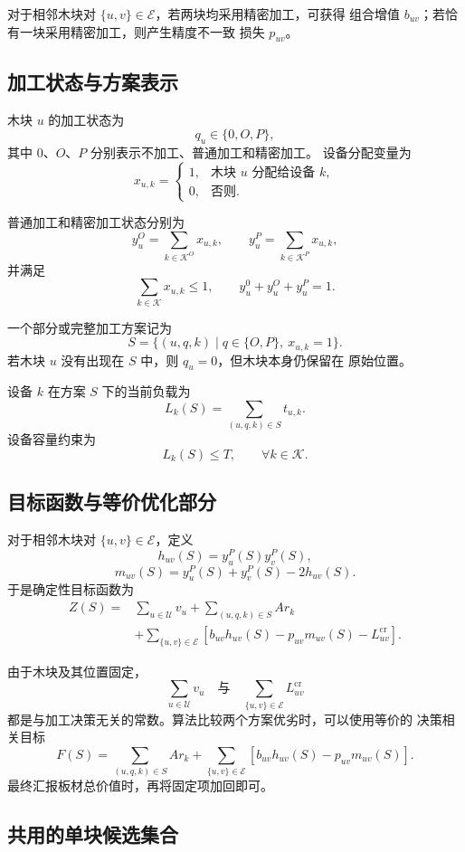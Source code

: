 \documentclass[UTF8,12pt,a4paper]{ctexart}
\newcommand{\U}{\mathcal{U}}
\newcommand{\K}{\mathcal{K}}
\newcommand{\KO}{\mathcal{K}^{O}}
\newcommand{\KP}{\mathcal{K}^{P}}
\newcommand{\E}{\mathcal{E}}
\newcommand{\load}{L}
\begin{document}
对于相邻木块对 \(\{u,v\}\in\E\)，若两块均采用精密加工，可获得
组合增值 \(b_{uv}\)；若恰有一块采用精密加工，则产生精度不一致
损失 \(p_{uv}\)。

\subsection{加工状态与方案表示}

木块 \(u\) 的加工状态为
\[
q_u\in\{0,O,P\},
\]
其中 \(0\)、\(O\)、\(P\) 分别表示不加工、普通加工和精密加工。
设备分配变量为
\[
x_{u,k}=
\begin{cases}
1, & \text{木块 \(u\) 分配给设备 \(k\)},\\
0, & \text{否则}.
\end{cases}
\]

普通加工和精密加工状态分别为
\[
y_u^{O}=\sum_{k\in\KO}x_{u,k},
\qquad
y_u^{P}=\sum_{k\in\KP}x_{u,k},
\]
并满足
\[
\sum_{k\in\K}x_{u,k}\leq 1,
\qquad
y_u^{0}+y_u^{O}+y_u^{P}=1.
\]

一个部分或完整加工方案记为
\[
S=\{(u,q,k)\mid q\in\{O,P\},\ x_{u,k}=1\}.
\]
若木块 \(u\) 没有出现在 \(S\) 中，则 \(q_u=0\)，但木块本身仍保留在
原始位置。

设备 \(k\) 在方案 \(S\) 下的当前负载为
\[
\boxed{
\load_k(S)
=
\sum_{(u,q,k)\in S}t_{u,k}
}.
\]
设备容量约束为
\[
\load_k(S)\leq T,
\qquad \forall k\in\K.
\]

\subsection{目标函数与等价优化部分}

对于相邻木块对 \(\{u,v\}\in\E\)，定义
\[
h_{uv}(S)=y_u^P(S)y_v^P(S),
\]
\[
m_{uv}(S)
=
y_u^P(S)+y_v^P(S)-2h_{uv}(S).
\]
于是确定性目标函数为
\[
\begin{aligned}
Z(S)
={}&
\sum_{u\in\U}v_u
+
 \sum_{(u,q,k)\in S}A r_k\\
&+
\sum_{\{u,v\}\in\E}
\left[
b_{uv}h_{uv}(S)
-
p_{uv}m_{uv}(S)
-
L_{uv}^{\mathrm{cr}}
\right].
\end{aligned}
\]

由于木块及其位置固定，
\[
\sum_{u\in\U}v_u
\quad\text{与}\quad
\sum_{\{u,v\}\in\E}L_{uv}^{\mathrm{cr}}
\]
都是与加工决策无关的常数。算法比较两个方案优劣时，可以使用等价的
决策相关目标
\[
\boxed{
F(S)
=
\sum_{(u,q,k)\in S}A r_k
+
\sum_{\{u,v\}\in\E}
\left[
b_{uv}h_{uv}(S)-p_{uv}m_{uv}(S)
\right]
}.
\]
最终汇报板材总价值时，再将固定项加回即可。

\subsection{共用的单块候选集合}
\end{document}

